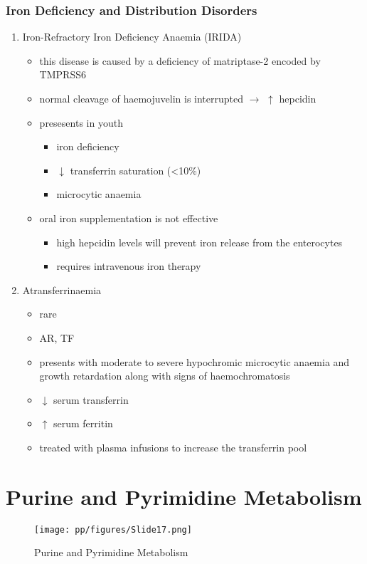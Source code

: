 \documentclass[12pt]{scrartcl}
\begin{document}
\subsubsection{Iron Deficiency and Distribution Disorders}
\label{sec:org66dc0f4}
\begin{enumerate}
\item Iron-Refractory Iron Deficiency Anaemia (IRIDA)
\label{sec:org0190422}
\begin{itemize}
\item this disease is caused by a deficiency of matriptase-2 encoded by TMPRSS6
\item normal cleavage of haemojuvelin is interrupted \(\to\) \(\uparrow\) hepcidin
\item presesents in youth
\begin{itemize}
\item iron deficiency
\item \(\downarrow\) transferrin saturation (<10\%)
\item microcytic anaemia
\end{itemize}
\item oral iron supplementation is not effective
\begin{itemize}
\item high hepcidin levels will prevent iron release from the
enterocytes
\item requires intravenous iron therapy
\end{itemize}
\end{itemize}

\item Atransferrinaemia
\label{sec:orgda9a2b1}
\begin{itemize}
\item rare
\item AR, TF
\item presents with moderate to severe hypochromic microcytic anaemia and
growth retardation along with signs of haemochromatosis
\item \(\downarrow\) serum transferrin
\item \(\uparrow\) serum ferritin
\item treated with plasma infusions to increase the transferrin pool
\end{itemize}
\end{enumerate}
\section{Purine and Pyrimidine Metabolism}
\label{sec:orgee86d08}
\begin{figure}[htbp]
\centering
\texttt{[image: pp/figures/Slide17.png]}
\caption{\label{fig:org13185f5}Purine and Pyrimidine Metabolism}
\end{figure}
\end{document}
